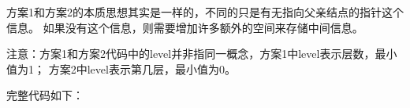 \begin{description}
方案1和方案2的本质思想其实是一样的，不同的只是有无指向父亲结点的指针这个信息。 如果没有这个信息，则需要增加许多额外的空间来存储中间信息。

注意：方案1和方案2代码中的level并非指同一概念，方案1中level表示层数，最小值为1； 方案2中level表示第几层，最小值为0。

完整代码如下：



\end{description}

